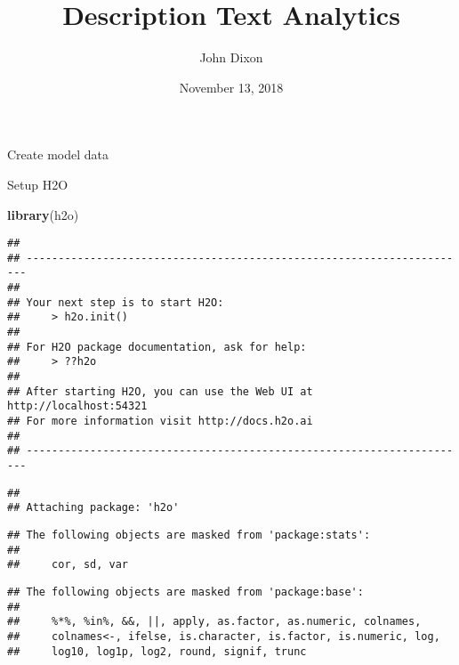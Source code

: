 \documentclass[]{article}
\title{Description Text Analytics}
\author{John Dixon}
\date{November 13, 2018}
\newenvironment{Shaded}{\begin{snugshade}}{\end{snugshade}}
\newcommand{\KeywordTok}[1]{\textcolor[rgb]{0.13,0.29,0.53}{\textbf{{#1}}}}
\newcommand{\DataTypeTok}[1]{\textcolor[rgb]{0.13,0.29,0.53}{{#1}}}
\newcommand{\DecValTok}[1]{\textcolor[rgb]{0.00,0.00,0.81}{{#1}}}
\newcommand{\StringTok}[1]{\textcolor[rgb]{0.31,0.60,0.02}{{#1}}}
\newcommand{\NormalTok}[1]{{#1}}
\begin{document}
\maketitle

Create model data

\begin{Shaded}
\end{Shaded}

Setup H2O

\begin{Shaded}
\begin{Highlighting}[]
\KeywordTok{library}\NormalTok{(h2o)}
\end{Highlighting}
\end{Shaded}

\begin{verbatim}
## 
## ----------------------------------------------------------------------
## 
## Your next step is to start H2O:
##     > h2o.init()
## 
## For H2O package documentation, ask for help:
##     > ??h2o
## 
## After starting H2O, you can use the Web UI at http://localhost:54321
## For more information visit http://docs.h2o.ai
## 
## ----------------------------------------------------------------------
\end{verbatim}

\begin{verbatim}
## 
## Attaching package: 'h2o'
\end{verbatim}

\begin{verbatim}
## The following objects are masked from 'package:stats':
## 
##     cor, sd, var
\end{verbatim}

\begin{verbatim}
## The following objects are masked from 'package:base':
## 
##     %*%, %in%, &&, ||, apply, as.factor, as.numeric, colnames,
##     colnames<-, ifelse, is.character, is.factor, is.numeric, log,
##     log10, log1p, log2, round, signif, trunc
\end{verbatim}
\end{document}
